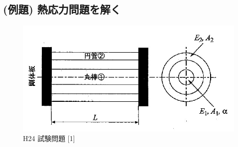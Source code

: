 \documentclass[a4paper]{jsarticle}
\begin{document}
\subsection{(例題) 熱応力問題を解く}
\begin{figure}[htbp]
    \begin{center}
        \includegraphics[width=120mm]{images/zairiki_image4.jpg}
        \caption{H24 試験問題 [1]}
    \end{center}
\end{figure}
\end{document}
